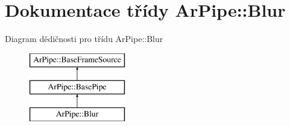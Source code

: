 \hypertarget{class_ar_pipe_1_1_blur}{\section{Dokumentace třídy Ar\-Pipe\-:\-:Blur}
\label{d1/df9/class_ar_pipe_1_1_blur}
}
Diagram dědičnosti pro třídu Ar\-Pipe\-:\-:Blur\begin{figure}[H]
\begin{center}
\leavevmode
\includegraphics[height=3.000000cm]{d1/df9/class_ar_pipe_1_1_blur}
\end{center}
\end{figure}
